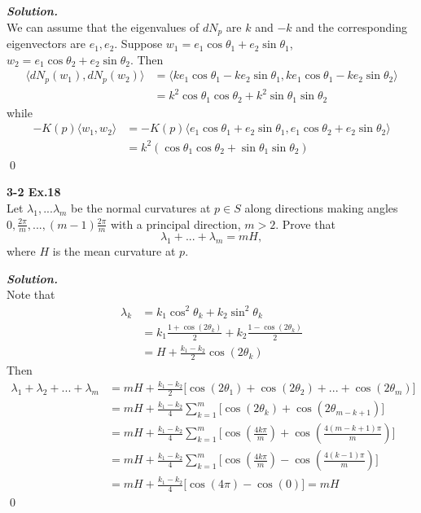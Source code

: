 \documentclass{article}
\begin{document}
\par
\textbf{\textit{Solution.}}\\
We can assume that the eigenvalues of $dN_p$ are $k$ and $-k$ and
the corresponding eigenvectors are $e_1,e_2$. 
Suppose $w_1 = e_1 \cos \theta_1 + e_2 \sin \theta_1$,
$w_2 = e_1 \cos \theta_2 + e_2 \sin \theta_2$.
Then
$$
\begin{aligned}
    \langle dN_p(w_1), dN_p(w_2) \rangle
    &= \langle ke_1 \cos \theta_1 - ke_2 \sin \theta_1, ke_1 \cos \theta_1 - ke_2 \sin \theta_2 \rangle\\
    &= k^2\cos \theta_1 \cos \theta_2 + k^2 \sin \theta_1 \sin \theta_2
\end{aligned}
$$
while
$$
\begin{aligned}
    -K(p)\langle w_1, w_2 \rangle &= -K(p) \langle e_1 \cos \theta_1 + e_2 \sin \theta_1, e_1 \cos \theta_2 + e_2 \sin \theta_2\rangle\\
    &= k^2(\cos \theta_1 \cos \theta_2 + \sin \theta_1 \sin \theta_2)
\end{aligned}
$$
\qed

\par
\textbf{3-2 Ex.18}\\
Let $\lambda_1, ... \lambda_m$ be the normal curvatures at
$p \in S$ along directions making angles $0, \frac{2\pi}{m}, ..., (m-1)\frac{2\pi}{m}$
with a principal direction, $m>2$. Prove that
$$
    \lambda_1 + ... + \lambda_m = mH,
$$
where $H$ is the mean curvature at $p$.

\par
\textbf{\textit{Solution.}}\\
Note that
$$
\begin{aligned}
    \lambda_k &= k_1 \cos^2 \theta_k + k_2 \sin^2 \theta_k \\
    &= k_1 \frac{1 + \cos (2 \theta_k)}{2} + k_2 \frac{1 - \cos (2 \theta_k)}{2} \\ 
    &= H + \frac{k_1 - k_2}{2}\cos (2 \theta_k)
\end{aligned}
$$
Then
$$
\begin{aligned}
    \lambda_1 + \lambda_2 + ... + \lambda_m &= mH + \frac{k_1 - k_2}{2}\bigl[\cos(2\theta_1)+ \cos(2\theta_2)+ ... + \cos(2\theta_m)\bigr]\\
    &=mH + \frac{k_1-k_2}{4}\sum_{k=1}^m\bigl[\cos(2\theta_k) + \cos(2\theta_{m-k+1})\bigr]\\
    &=mH + \frac{k_1-k_2}{4}\sum_{k=1}^m\bigl[\cos(\frac{4k\pi}{m}) + \cos(\frac{4(m-k+1)\pi}{m})\bigr]\\
    &=mH + \frac{k_1-k_2}{4}\sum_{k=1}^m\bigl[\cos(\frac{4k\pi}{m}) - \cos(\frac{4(k-1)\pi}{m})\bigr]\\
    &=mH + \frac{k_1-k_2}{4}\bigl[\cos(4\pi) - \cos(0)\bigr] = mH
\end{aligned}
$$
\qed
\end{document}
